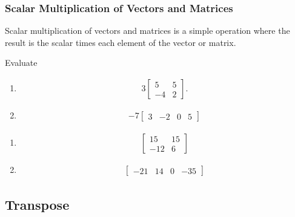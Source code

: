 \subsubsection{Scalar Multiplication of Vectors and Matrices}

Scalar multiplication of vectors and matrices is a simple operation where the result is the scalar times each element of the vector or matrix.

\begin{example}
	Evaluate


\begin{enumerate}[label=(\alph*)]
\item
\begin{align*} 3
\begin{bmatrix}
	5 & 5 \\
-4 & 2
\end{bmatrix}.
\end{align*}

\item \begin{align*}
-7 \begin{bmatrix}
 3 & -2 & 0 & 5
\end{bmatrix}
\end{align*}
\end{enumerate}

\solution

\begin{enumerate}[label=(\alph*)]
\item
\begin{align*}
\begin{bmatrix}
	15 & 15 \\ -12 & 6
\end{bmatrix}
\end{align*}

\item
\begin{align*}
\begin{bmatrix}
 -21 & 14 & 0 & -35
\end{bmatrix}
\end{align*}
\end{enumerate}
\end{example}

\subsection{Transpose} \label{sect:transpose}

